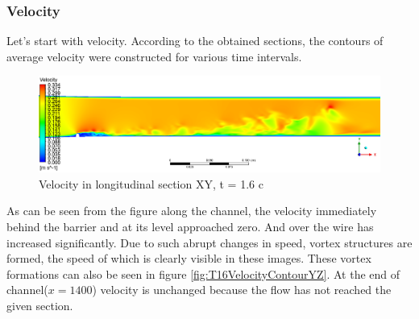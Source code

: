 \subsubsection{Velocity}
	Let's start with velocity. According to the obtained sections, the contours of average velocity were constructed for various time intervals.
	\begin{figure}[H]
		\centering
		\includegraphics[width=1\linewidth]{../Assets/T16_Velocity_ContourXY}
		\caption{Velocity in longitudinal section XY, t = 1.6 c}
		\label{fig:t16velocitycontourxy}
	\end{figure}
	As can be seen from the figure along the channel, the velocity immediately behind the barrier and at its level approached zero. And over the wire has increased significantly. Due to such abrupt changes in speed, vortex structures are formed, the speed of which is clearly visible in these images. These vortex formations can also be seen in figure \ref{fig:T16VelocityContourYZ}. At the end of channel($x = 1400$) velocity is unchanged because the flow has not reached the given section.
